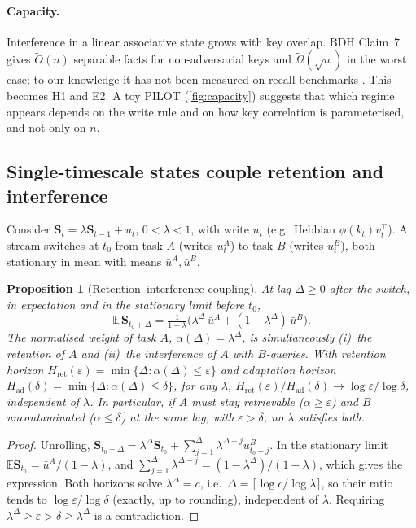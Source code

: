 \documentclass[10pt]{article}
\newtheorem{proposition}{Proposition}
\theoremstyle{remark}
\newcommand{\Sm}{\mathbf{S}}
\begin{document}
\paragraph{Capacity.} Interference in a linear associative state grows with key overlap. BDH Claim~7 gives
$\tilde O(n)$ separable facts for non-adversarial keys and $\tilde\Omega(\sqrt n)$ in the worst case; to our
knowledge it has not been measured on recall benchmarks \citep{arora2023zoology}. This becomes H1 and E2. A toy
PILOT (\cref{fig:capacity}) suggests that which regime appears depends on the write rule and on how key correlation
is parameterised, and not only on $n$.

\subsection{Single-timescale states couple retention and interference}
\label{sec:coupling}

Consider $\Sm_t=\lambda\Sm_{t-1}+u_t$, $0<\lambda<1$, with write $u_t$ (e.g.\ Hebbian $\phi(k_t)v_t^\top$). A stream
switches at $t_0$ from task $A$ (writes $u^A_t$) to task $B$ (writes $u^B_t$), both stationary in mean with means
$\bar u^A,\bar u^B$.

\begin{proposition}[Retention--interference coupling]
\label{prop:coupling}
At lag $\Delta\ge0$ after the switch, in expectation and in the stationary limit before $t_0$,
\[
\mathbb{E}\,\Sm_{t_0+\Delta}=\tfrac{1}{1-\lambda}\big(\lambda^{\Delta}\,\bar u^A+(1-\lambda^{\Delta})\,\bar u^B\big).
\]
The normalised weight of task $A$, $\alpha(\Delta)=\lambda^\Delta$, is simultaneously (i)~the \emph{retention} of
$A$ and (ii)~the \emph{interference} of $A$ with $B$-queries. With retention horizon
$H_{\mathrm{ret}}(\varepsilon)=\min\{\Delta:\alpha(\Delta)\le\varepsilon\}$ and adaptation horizon
$H_{\mathrm{ad}}(\delta)=\min\{\Delta:\alpha(\Delta)\le\delta\}$, for any $\lambda$,
$H_{\mathrm{ret}}(\varepsilon)/H_{\mathrm{ad}}(\delta)\to\log\varepsilon/\log\delta$, independent of $\lambda$.
In particular, if $A$ must stay retrievable ($\alpha\ge\varepsilon$) and $B$ uncontaminated ($\alpha\le\delta$) at the
same lag, with $\varepsilon>\delta$, no $\lambda$ satisfies both.
\end{proposition}
\begin{proof}
Unrolling, $\Sm_{t_0+\Delta}=\lambda^\Delta\Sm_{t_0}+\sum_{j=1}^{\Delta}\lambda^{\Delta-j}u^B_{t_0+j}$. In the
stationary limit $\mathbb{E}\Sm_{t_0}=\bar u^A/(1-\lambda)$, and $\sum_{j=1}^{\Delta}\lambda^{\Delta-j}=(1-\lambda^\Delta)/(1-\lambda)$,
which gives the expression. Both horizons solve $\lambda^\Delta=c$, i.e.\ $\Delta=\lceil\log c/\log\lambda\rceil$, so
their ratio tends to $\log\varepsilon/\log\delta$ (exactly, up to rounding), independent of $\lambda$. Requiring
$\lambda^\Delta\ge\varepsilon>\delta\ge\lambda^\Delta$ is a contradiction.
\end{proof}
\end{document}
